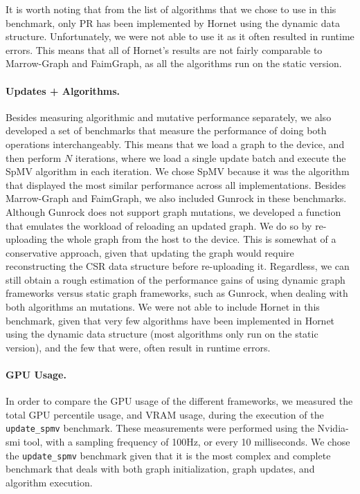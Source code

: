 It is worth noting that from the list of algorithms that we chose to use in this benchmark, only \gls{PR} has been implemented by Hornet using the dynamic data structure. Unfortunately, we were not able to use it as it often resulted in runtime errors. This means that all of Hornet's results are not fairly comparable to Marrow-Graph and FaimGraph, as all the algorithms run on the static version.
    
\paragraph{\textbf{Updates + Algorithms}.} Besides measuring algorithmic and mutative performance separately, we also developed a set of benchmarks that measure the performance of doing both operations interchangeably. This means that we load a graph to the device, and then perform $N$ iterations, where we load a single update batch and execute the \gls{SpMV} algorithm in each iteration. We chose \gls{SpMV} because it was the algorithm that displayed the most similar performance across all implementations. Besides Marrow-Graph and FaimGraph, we also included Gunrock in these benchmarks. Although Gunrock does not support graph mutations, we developed a function that emulates the workload of reloading an updated graph. We do so by re-uploading the whole graph from the host to the device. This is somewhat of a conservative approach, given that updating the graph would require reconstructing the CSR data structure before re-uploading it. Regardless, we can still obtain a rough estimation of the performance gains of using dynamic graph frameworks versus static graph frameworks, such as Gunrock, when dealing with both algorithms an mutations. We were not able to include Hornet in this benchmark, given that very few algorithms have been implemented in Hornet using the dynamic data structure (most algorithms only run on the static version), and the few that were, often result in runtime errors.

\paragraph{\textbf{\gls{GPU} Usage}.} In order to compare the \gls{GPU} usage of the different frameworks, we measured the total \gls{GPU} percentile usage, and \gls{VRAM} usage, during the execution of the \texttt{update\_spmv} benchmark. These measurements were performed using the Nvidia-smi tool, with a sampling frequency of 100Hz, or every 10 milliseconds. We chose the \texttt{update\_spmv} benchmark given that it is the most complex and complete benchmark that deals with both graph initialization, graph updates, and algorithm execution.

